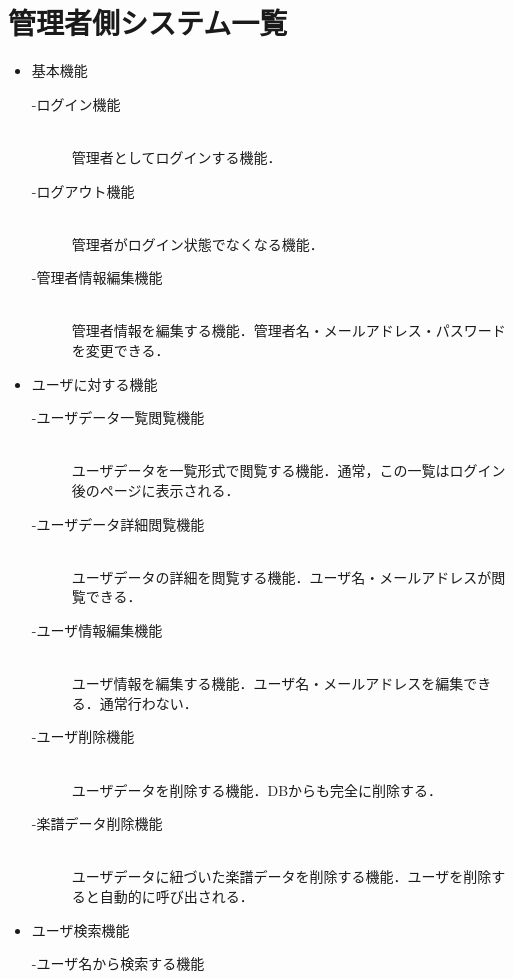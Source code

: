 \section{管理者側システム一覧}
\begin{itemize}
    \item 基本機能
          \begin{description}
              \item[-ログイン機能]\mbox{}\\
              管理者としてログインする機能．
              \item[-ログアウト機能] \mbox{}\\
                  管理者がログイン状態でなくなる機能．
              \item[-管理者情報編集機能] \mbox{}\\
                  管理者情報を編集する機能．管理者名・メールアドレス・パスワードを変更できる．
          \end{description}
    \item ユーザに対する機能
          \begin{description}
              \item[-ユーザデータ一覧閲覧機能] \mbox{}\\
                  ユーザデータを一覧形式で閲覧する機能．通常，この一覧はログイン後のページに表示される．
              \item[-ユーザデータ詳細閲覧機能] \mbox{}\\
                  ユーザデータの詳細を閲覧する機能．ユーザ名・メールアドレスが閲覧できる．
              \item[-ユーザ情報編集機能] \mbox{}\\
                  ユーザ情報を編集する機能．ユーザ名・メールアドレスを編集できる．通常行わない．
              \item[-ユーザ削除機能] \mbox{}\\
                  ユーザデータを削除する機能．DBからも完全に削除する．
              \item[-楽譜データ削除機能] \mbox{}\\
                  ユーザデータに紐づいた楽譜データを削除する機能．ユーザを削除すると自動的に呼び出される．
          \end{description}
    \item ユーザ検索機能
          \begin{description}
              \item[-ユーザ名から検索する機能] \mbox{}\\

\end{description}
\end{itemize}
